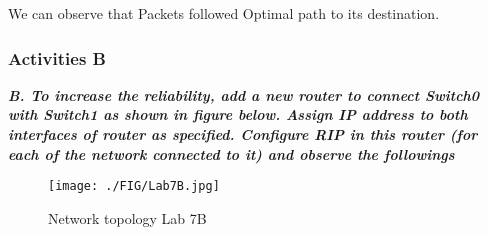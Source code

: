 \documentclass[a4paper,11pt]{article}
\begin{document}
\begin{enumerate}





\end{enumerate}


We can observe that Packets followed Optimal path to its destination.


\pagebreak

%
%
%
%


%
%
%



\subsubsection{Activities B}

{\bfseries \textit{B. To increase the reliability, add a new router to connect Switch0 with Switch1 as shown in
        figure below. Assign IP address to both interfaces of router as specified. Configure RIP in this
        router (for each of the network connected to it) and observe the followings}}

\begin{figure}[H]
    \centering
    \texttt{[image: ./FIG/Lab7B.jpg]}
    \caption{Network topology Lab 7B}
\end{figure}
\end{document}
